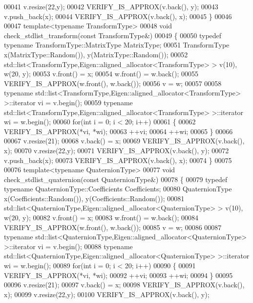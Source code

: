 \begin{DoxyCode}
00041   v.resize(22,y);
00042   VERIFY\_IS\_APPROX(v.back(), y);
00043   v.push\_back(x);
00044   VERIFY\_IS\_APPROX(v.back(), x);
00045 \}
00046 
00047 \textcolor{keyword}{template}<\textcolor{keyword}{typename} TransformType>
00048 \textcolor{keywordtype}{void} check\_stdlist\_transform(\textcolor{keyword}{const} TransformType&)
00049 \{
00050   \textcolor{keyword}{typedef} \textcolor{keyword}{typename} TransformType::MatrixType MatrixType;
00051   TransformType x(MatrixType::Random()), y(MatrixType::Random());
00052   std::list<TransformType,Eigen::aligned\_allocator<TransformType> > v(10), w(20, y);
00053   v.front() = x;
00054   w.front() = w.back();
00055   VERIFY\_IS\_APPROX(w.front(), w.back());
00056   v = w;
00057 
00058   \textcolor{keyword}{typename} std::list<TransformType,Eigen::aligned\_allocator<TransformType> >::iterator vi = v.begin();
00059   \textcolor{keyword}{typename} std::list<TransformType,Eigen::aligned\_allocator<TransformType> >::iterator wi = w.begin();
00060   \textcolor{keywordflow}{for}(\textcolor{keywordtype}{int} i = 0; i < 20; i++)
00061   \{
00062     VERIFY\_IS\_APPROX(*vi, *wi);
00063     ++vi;
00064     ++wi;
00065   \}
00066 
00067   v.resize(21);
00068   v.back() = x;
00069   VERIFY\_IS\_APPROX(v.back(), x);
00070   v.resize(22,y);
00071   VERIFY\_IS\_APPROX(v.back(), y);
00072   v.push\_back(x);
00073   VERIFY\_IS\_APPROX(v.back(), x);
00074 \}
00075 
00076 \textcolor{keyword}{template}<\textcolor{keyword}{typename} QuaternionType>
00077 \textcolor{keywordtype}{void} check\_stdlist\_quaternion(\textcolor{keyword}{const} QuaternionType&)
00078 \{
00079   \textcolor{keyword}{typedef} \textcolor{keyword}{typename} QuaternionType::Coefficients Coefficients;
00080   QuaternionType x(Coefficients::Random()), y(Coefficients::Random());
00081   std::list<QuaternionType,Eigen::aligned\_allocator<QuaternionType> > v(10), w(20, y);
00082   v.front() = x;
00083   w.front() = w.back();
00084   VERIFY\_IS\_APPROX(w.front(), w.back());
00085   v = w;
00086 
00087   \textcolor{keyword}{typename} std::list<QuaternionType,Eigen::aligned\_allocator<QuaternionType> >::iterator vi = v.begin();
00088   \textcolor{keyword}{typename} std::list<QuaternionType,Eigen::aligned\_allocator<QuaternionType> >::iterator wi = w.begin();
00089   \textcolor{keywordflow}{for}(\textcolor{keywordtype}{int} i = 0; i < 20; i++)
00090   \{
00091     VERIFY\_IS\_APPROX(*vi, *wi);
00092     ++vi;
00093     ++wi;
00094   \}
00095 
00096   v.resize(21);
00097   v.back() = x;
00098   VERIFY\_IS\_APPROX(v.back(), x);
00099   v.resize(22,y);
00100   VERIFY\_IS\_APPROX(v.back(), y);

\end{DoxyCode}
